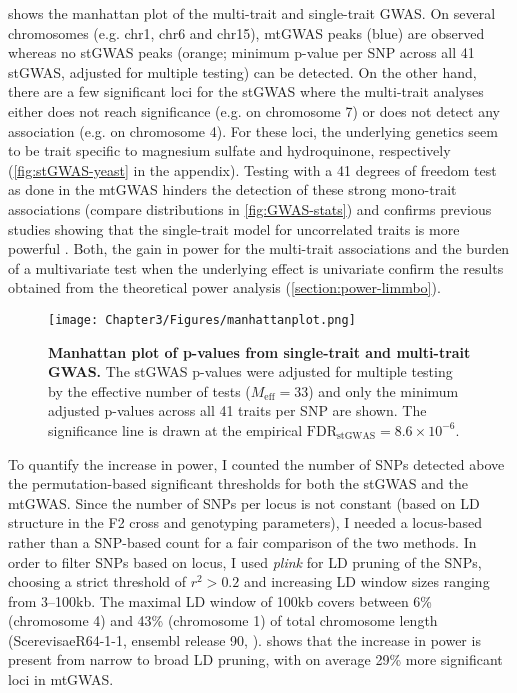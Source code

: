  shows the manhattan plot of the multi-trait and single-trait GWAS. On several chromosomes (e.g. chr1, chr6 and chr15), mtGWAS peaks (blue) are observed whereas no stGWAS peaks (orange; minimum p-value per SNP across all \num{41} stGWAS, adjusted for multiple testing) can be detected. On the other hand, there are a few significant loci for the stGWAS where the multi-trait analyses either does not reach significance (e.g. on chromosome \num{7}) or does not detect any association (e.g. on chromosome \num{4}). For these loci, the underlying genetics seem to be trait specific to magnesium sulfate and hydroquinone, respectively (\cref{fig:stGWAS-yeast} in the appendix). Testing with a \num{41} degrees of freedom test as done in the mtGWAS hinders the detection of these strong mono-trait associations (compare distributions in \cref{fig:GWAS-stats}) and confirms previous studies showing that the single-trait model for uncorrelated traits is more powerful \citep{Korte2010}. Both, the gain in power for the multi-trait associations and the burden of a multivariate test when the underlying effect is univariate confirm the results obtained from the theoretical power analysis (\cref{section:power-limmbo}). 

\begin{figure}[hbtp]
	\centering
	\texttt{[image: Chapter3/Figures/manhattanplot.png]}
	\caption[\textbf{Manhattan plot of p-values from single-trait and multi-trait GWAS.}]{\textbf{Manhattan plot of p-values from single-trait and multi-trait GWAS.} The stGWAS p-values were adjusted for multiple testing by the effective number of tests (\(M_\text{eff} = 33\)) and only the minimum adjusted p-values across all \num{41} traits per SNP are shown. The significance line is drawn at the empirical \(\text{FDR}_{\text{stGWAS}} =8.6 \times 10^{-6}\).}
 	\label{fig:GWAS-yeast}
\end{figure}

To quantify the increase in power, I counted the number of SNPs detected above the permutation-based significant thresholds for both the stGWAS and the mtGWAS. Since the number of SNPs per locus is not constant (based on LD structure in the F2 cross and genotyping parameters), I needed a locus-based rather than a SNP-based count for a fair comparison of the two methods. In order to filter SNPs based on locus, I used \textit{plink} for LD pruning of the SNPs, choosing a strict threshold of \(r^2 > 0.2\) and increasing LD window sizes ranging from \numrange{3}{100}kb.  The maximal LD window of \num{100}kb covers between \num{6}\% (chromosome \num{4}) and \num{43}\% (chromosome 1) of total chromosome length (ScerevisaeR64-1-1, ensembl release 90, \citep{Aken2016}).  shows that the increase in power is present from narrow to broad LD pruning, with on average \num{29}\% more significant loci in mtGWAS.

